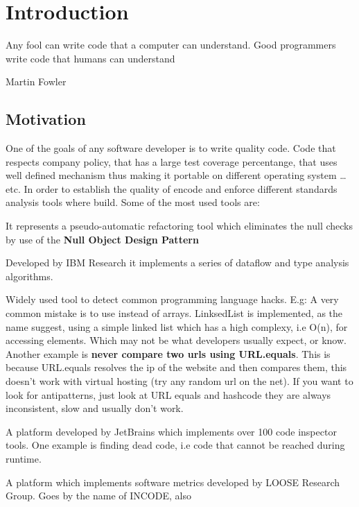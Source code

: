 \chapter{Introduction}\label{ch:1}

\epigraph{Any fool can write code that a computer can understand. Good
programmers write code that humans can understand}{Martin Fowler}

\section{Motivation}

        One of the goals of any software developer is to write quality code. Code that respects company policy, that has a
large test coverage percentange, that uses well defined mechanism thus making it portable on different operating system \ldots{} etc. 
In order to establish the quality of encode and enforce different standards analysis tools where build. Some of the most 
used tools are:
        \begin{description}[labelindent=2cm]
        \item[NullTerminator] It represents a pseudo-automatic refactoring tool which 
        eliminates the null checks by use of the \textbf{Null Object Design Pattern} \cite{tools:nullTerminator}
        \item[Wala Tool]  Developed by IBM Research it implements a series of dataflow
        and type analysis algorithms.
        \item[FindBugs]   Widely used tool to detect common programming language hacks. E.g: A very common mistake is to use  instead
of arrays. LinksedList is implemented, as the name suggest, using a simple linked list which has a high complexy, i.e O(n), for accessing elements. Which may not
be what developers usually expect, or know. Another example is \textbf{never compare two urls using URL.equals}. This is because URL.equals resolves the ip of the
website and then compares them, this doesn't work with virtual hosting (try any random url on the net). If you want to look for antipatterns, just look at URL equals
and hashcode they are always inconsistent, slow and usually don't work.
        \item[Intellij IDE] A platform developed by JetBrains which implements over 100 code inspector tools. One example is finding dead code, i.e code that cannot 
be reached during runtime.
        \item[CodePro]   A platform which implements software metrics developed by
        LOOSE Research Group. Goes by the name of INCODE, also \cite{tools:inCode}
        \end{description}

